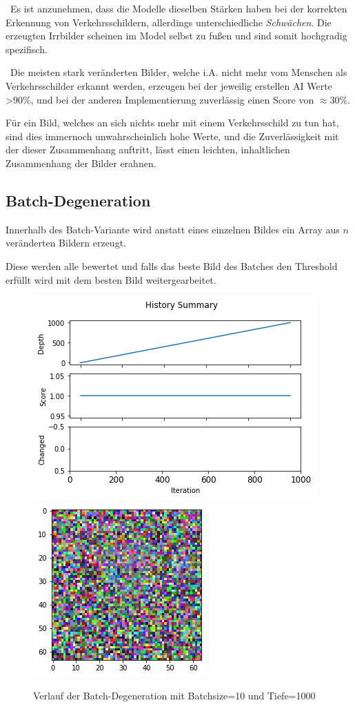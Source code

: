 ~\newline Es ist anzunehmen, dass die Modelle dieselben Stärken haben bei der korrekten Erkennung von Verkehrsschildern, allerdings unterschiedliche \textit{Schwächen}. Die erzeugten Irrbilder scheinen im Model selbst zu fußen und sind somit hochgradig spezifisch. 

~\newline Die meisten stark veränderten Bilder, welche i.A. nicht mehr vom Menschen als Verkehrsschilder erkannt werden, erzeugen bei der jeweilig erstellen AI Werte >90\%, und bei der anderen Implementierung zuverlässig einen Score von $\approx$30\%. 

Für ein Bild, welches an sich nichts mehr mit einem Verkehrsschild zu tun hat, sind dies immernoch unwahrscheinlich hohe Werte, und die Zuverlässigkeit mit der dieser Zusammenhang auftritt, lässt einen leichten, inhaltlichen Zusammenhang der Bilder erahnen.

\newpage
\subsection{Batch-Degeneration}
Innerhalb des Batch-Variante wird anstatt eines einzelnen Bildes ein Array aus $n$ veränderten Bildern erzeugt. 

Diese werden alle bewertet und falls das beste Bild des Batches den Threshold erfüllt wird mit dem besten Bild weitergearbeitet. 

\begin{figure}[h]
	\centering
	\includegraphics[width=0.5\linewidth]{Images/DegenSamples/BatchDegPlotTiefe1000}
	\includegraphics[width=0.35\linewidth]{Images/DegenSamples/BatchDegTiefe1000}
	\caption[Batch-Degeneration-Plot]{Verlauf der Batch-Degeneration mit Batchsize=10 und Tiefe=1000}
	\label{fig:batchdegplottiefe1000}
\end{figure}

